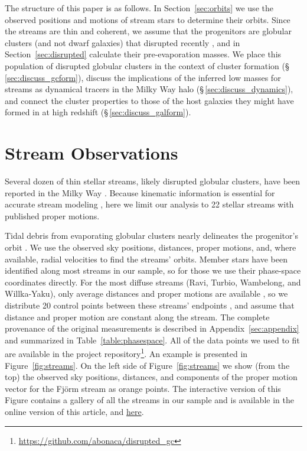 \documentclass[twocolumn]{aastex63}
\newcommand{\package}[1]{\textsl{#1}}
\begin{document}
The structure of this paper is as follows.
In Section~\ref{sec:orbits} we use the observed positions and motions of stream stars to determine their orbits.
Since the streams are thin and coherent, we assume that the progenitors are globular clusters (and not dwarf galaxies) that disrupted recently \citep{helmi:2003}, and in Section~\ref{sec:disrupted} calculate their pre-evaporation masses.
We place this population of disrupted globular clusters in the context of cluster formation (\S\,\ref{sec:discuss_gcform}), discuss the implications of the inferred low masses for streams as dynamical tracers in the Milky Way halo (\S\,\ref{sec:discuss_dynamics}), and connect the cluster properties to those of the host galaxies they might have formed in at high redshift (\S\,\ref{sec:discuss_galform}).

\section{Stream Observations}
\label{sec:obs}

Several dozen of thin stellar streams, likely disrupted globular clusters, have been reported in the Milky Way \citep[an up-to-date list is available in the \package{galstreams} package,][]{mateu:2018}.
Because kinematic information is essential for accurate stream modeling \citep{bh:2018}, here we limit our analysis to 22 stellar streams with published proper motions.

Tidal debris from evaporating globular clusters nearly delineates the progenitor's orbit \citep[e.g.,][]{dehnen:2004, koposov:2010, kupper:2012}.
We use the observed sky positions, distances, proper motions, and, where available, radial velocities to find the streams' orbits.
Member stars have been identified along most streams in our sample, so for those we use their phase-space coordinates directly.
For the most diffuse streams (Ravi, Turbio, Wambelong, and Willka-Yaku), only average distances and proper motions are available \citep{shipp:2019}, so we distribute 20 control points between these streams' endpoints \citep{riley:2020}, and assume that distance and proper motion are constant along the stream.
The complete provenance of the original measurements is described in Appendix~\ref{sec:appendix} and summarized in Table~\ref{table:phasespace}.
All of the data points we used to fit are available in the project repository\footnote{\url{https://github.com/abonaca/disrupted_gc}}.
An example is presented in Figure~\ref{fig:streams}. On the left side of Figure~\ref{fig:streams} we show (from the top) the observed sky positions, distances, and components of the proper motion vector for the Fj\" orm stream as orange points.
The interactive version of this Figure contains a gallery of all the streams in our sample and is available in the online version of this article, and \href{https://www.cfa.harvard.edu/~abonaca/stream_gallery/gallery.html}{here}.
\end{document}
